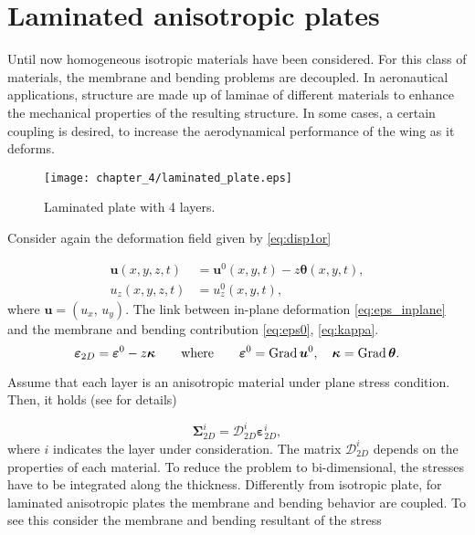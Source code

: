 \section{Laminated anisotropic plates}\label{sec:lamAnis}


Until now homogeneous isotropic materials have been considered. For this class of materials, the membrane and bending problems are decoupled. In aeronautical applications, structure are made up of laminae of different materials to enhance the mechanical properties of the resulting structure. In some cases, a certain coupling is desired, to increase the aerodynamical performance of the wing as it deforms.

\begin{figure}[tb]
	\centering
	\texttt{[image: chapter\_4/laminated\_plate.eps]}
	\caption{Laminated plate with 4 layers.}
	\label{fig:laminated_plate}
\end{figure}

Consider again the deformation field given by \eqref{eq:disp1or}

\begin{equation*}\label{eq:dis1or_2}
\begin{aligned}
\bm{u}(x,y,z,t) &= \bm{u}^0(x,y,t) -z \bm{\theta}(x,y,t), \\
u_z(x,y,z,t) &= u_z^0(x,y,t), 
\end{aligned}
\end{equation*}
where $\bm{u} = (u_x, \, u_y)$. The link between in-plane deformation \eqref{eq:eps_inplane} and the membrane and bending contribution \eqref{eq:eps0}, \eqref{eq:kappa}.
\begin{equation}
\bm{\varepsilon}_{2D} = \bm{\varepsilon}^0 - z \bm{\kappa} \qquad \text{where} \qquad \bm{\varepsilon}^0=\operatorname*{Grad} \bm{u}^0, \quad \bm{\kappa} = \operatorname*{Grad} \bm{\theta}.
\end{equation}

Assume that each layer is an anisotropic material under plane stress condition. Then, it holds (see \cite[Chapter 1]{reddy2003mechanics} for details)

\begin{equation*}
\bm{\Sigma}_{2D}^i = \bm{\mathcal{D}}_{2D}^i \bm{\varepsilon}_{2D}^i,
\end{equation*}  
where $i$ indicates the layer under consideration. The matrix $ \bm{\mathcal{D}}_{2D}^i$ depends on the properties of each material. To reduce the problem to bi-dimensional,  the stresses have to be integrated along the thickness. Differently from isotropic plate, for laminated anisotropic plates the membrane and bending behavior are coupled. To see this consider the membrane and bending resultant of the stress 

